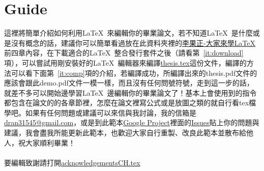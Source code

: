 
\chapter{Guide}
 這裡將簡單介紹如何利用\LaTeX\ 來編輯你的畢業論文，若不知道\LaTeX\ 是什麼或是沒有概念的話，建議你可以簡單看過放在此資料夾裡的\href{run:./latex123.pdf}{李果正-大家來學\LaTeX}前四章內容，在下載適合的\LaTeX\ 整合發行套件之後（請看第~\ref{it:download}項），可以嘗試用剛安裝好的\LaTeX\ 編輯器來編譯\href{run:./thesis.tex}{thesis.tex}這份文件，編譯的方法可以看下面第~\ref{it:comp}項的介紹，若編譯成功，所編譯出來的thesis.pdf文件的應該會跟此demo.pdf文件一模一樣，而且沒有任何問號符號，走到這一步的話，就差不多可以開始邊學習\LaTeX\ 邊編輯你的畢業論文了！基本上會使用到的指令都包含在論文的的各章節裡，怎麼在論文裡寫公式或是放圖之類的就自行看tex檔學吧。如果有任何問題或建議可以來信與我討論，我的信箱是\href{mailto:dran31545@gmail.com}{dran31545@gmail.com}，或是到此範本\href{http://code.google.com/p/ntu-thesis-latex-template/}{Google Project}裡面的\href{http://code.google.com/p/ntu-thesis-latex-template/issues/list}{Issues}貼上你的問題與建議，我會盡我所能更新此範本，也歡迎大家自行重製、改良此範本並散布給他人，祝大家順利畢業！\\\\
 要編輯致謝請打開\href{run:./acknowledgementsCH.tex}{acknowledgementsCH.tex}\\
